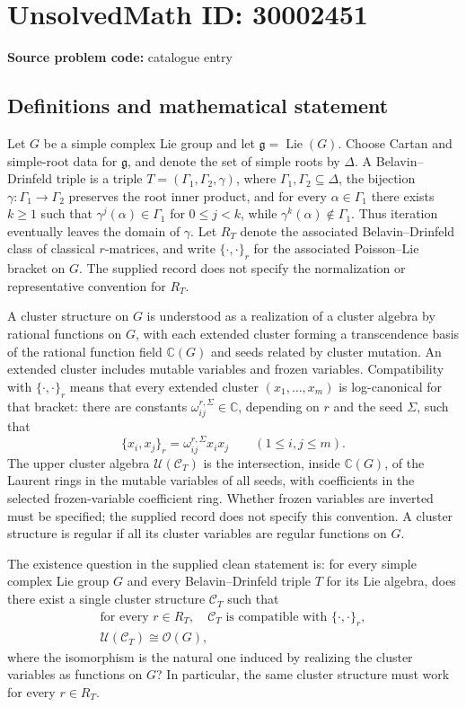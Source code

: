 \documentclass[11pt]{article}
\newcommand{\C}{\mathbb{C}}
\begin{document}
\section*{UnsolvedMath ID: 30002451}
\textbf{Source problem code:} catalogue entry
\subsection{Definitions and mathematical statement}
Let \(G\) be a simple complex Lie group and let \(\mathfrak g=\operatorname{Lie}(G)\). Choose Cartan and simple-root data for \(\mathfrak g\), and denote the set of simple roots by \(\Delta\). A Belavin--Drinfeld triple is a triple \(T=(\Gamma_1,\Gamma_2,\gamma)\), where \(\Gamma_1,\Gamma_2\subseteq\Delta\), the bijection \(\gamma:\Gamma_1\to\Gamma_2\) preserves the root inner product, and for every \(\alpha\in\Gamma_1\) there exists \(k\geq1\) such that \(\gamma^j(\alpha)\in\Gamma_1\) for \(0\leq j<k\), while \(\gamma^k(\alpha)\notin\Gamma_1\). Thus iteration eventually leaves the domain of \(\gamma\). Let \(R_T\) denote the associated Belavin--Drinfeld class of classical \(r\)-matrices, and write \(\{\cdot,\cdot\}_r\) for the associated Poisson--Lie bracket on \(G\). The supplied record does not specify the normalization or representative convention for \(R_T\).

A cluster structure on \(G\) is understood as a realization of a cluster algebra by rational functions on \(G\), with each extended cluster forming a transcendence basis of the rational function field \(\C(G)\) and seeds related by cluster mutation. An extended cluster includes mutable variables and frozen variables. Compatibility with \(\{\cdot,\cdot\}_r\) means that every extended cluster \((x_1,\ldots,x_m)\) is log-canonical for that bracket: there are constants \(\omega_{ij}^{r,\Sigma}\in\C\), depending on \(r\) and the seed \(\Sigma\), such that
\[
\{x_i,x_j\}_r=\omega_{ij}^{r,\Sigma}x_ix_j
\qquad(1\leq i,j\leq m).
\]
The upper cluster algebra \(\mathcal U(\mathcal C_T)\) is the intersection, inside \(\C(G)\), of the Laurent rings in the mutable variables of all seeds, with coefficients in the selected frozen-variable coefficient ring. Whether frozen variables are inverted must be specified; the supplied record does not specify this convention. A cluster structure is regular if all its cluster variables are regular functions on \(G\).

The existence question in the supplied clean statement is: for every simple complex Lie group \(G\) and every Belavin--Drinfeld triple \(T\) for its Lie algebra, does there exist a single cluster structure \(\mathcal C_T\) such that
\[
\begin{gathered}
\text{for every }r\in R_T,\quad
\mathcal C_T\text{ is compatible with }\{\cdot,\cdot\}_r,\\
\mathcal U(\mathcal C_T)\cong\mathcal O(G),
\end{gathered}
\]
where the isomorphism is the natural one induced by realizing the cluster variables as functions on \(G\)? In particular, the same cluster structure must work for every \(r\in R_T\).
\end{document}
